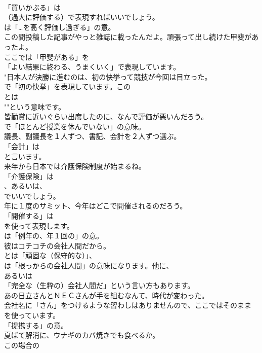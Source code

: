 \documentclass[8pt]{extreport}
\begin{document}
\begin{CJK}{UTF8}{min}
\\	「買いかぶる」は 
\\	（過大に評価する）で表現すればいいでしょう。
\\	は「…を高く評価し過ぎる」の意。	
\\	この間投稿した記事がやっと雑誌に載ったんだよ。頑張って出し続けた甲斐があったよ。 
\\	ここでは「甲斐がある」を
\\	「よい結果に終わる、うまくいく」で表現しています。	
\\	"日本人が決勝に進むのは、初の快挙って競技が今回は目立った。 
\\	で「初の快挙」を表現しています。この
\\	とは
\\	""という意味です。
\\	皆勤賞に近いぐらい出席したのに、なんで評価が悪いんだろう。 
\\	で「ほとんど授業を休んでいない」の意味。	
\\	議長、副議長を１人ずつ、書記、会計を２人ずつ選ぶ。 
\\	「会計」は
\\	と言います。	
\\	来年から日本では介護保険制度が始まるね。 
\\	「介護保険」は
\\	、あるいは、
\\	でいいでしょう。	
\\	年に１度のサミット、今年はどこで開催されるのだろう。 
\\	「開催する」は 
\\	を使って表現します。
\\	は「例年の、年１回の」の意。	
\\	彼はコチコチの会社人間だから。 
\\	とは「頑固な（保守的な）」、
\\	は「根っからの会社人間」の意味になります。他に、
\\	あるいは
\\	「完全な（生粋の）会社人間だ」という言い方もあります。	
\\	あの日立さんとＮＥＣさんが手を組むなんて、時代が変わった。 
\\	会社名に「さん」をつけるような習わしはありませんので、ここではそのまま
\\	を使っています。
\\	「提携する」の意。	
\\	夏ばて解消に、ウナギのカバ焼きでも食べるか。 
\\	この場合の 

\end{CJK}
\end{document}
